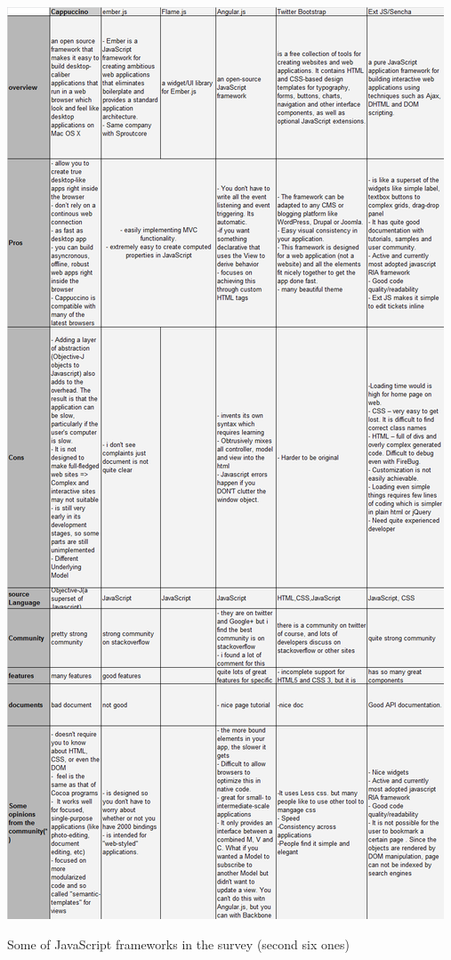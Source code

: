 \documentclass[14pt,a4paper]{extreport}
\begin{document}
			\begin{table}[ht]
				\begin{center}
					\includegraphics[scale=0.4]{JavaFrameTable2.png}
				
					\caption{Some of JavaScript frameworks in the survey (second six ones)}
				\end{center}
			
			\end{table}
			
\end{document}
